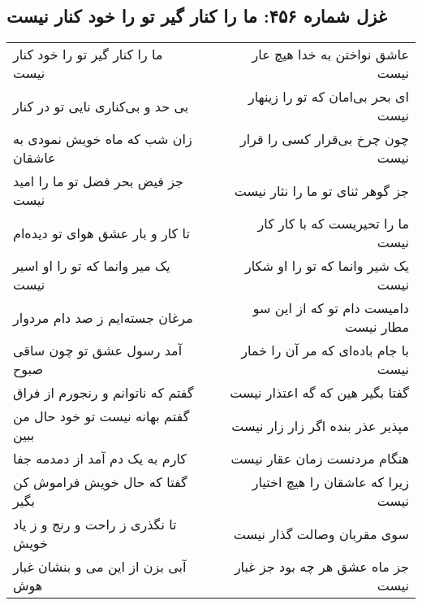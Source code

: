 \begin{center}
\section*{غزل شماره ۴۵۶: ما را کنار گیر تو را خود کنار نیست}
\label{sec:0456}
\begin{longtable}{l p{0.5cm} r}
ما را کنار گیر تو را خود کنار نیست
&&
عاشق نواختن به خدا هیچ عار نیست
\\
بی حد و بی‌کناری نایی تو در کنار
&&
ای بحر بی‌امان که تو را زینهار نیست
\\
زان شب که ماه خویش نمودی به عاشقان
&&
چون چرخ بی‌قرار کسی را قرار نیست
\\
جز فیض بحر فضل تو ما را امید نیست
&&
جز گوهر ثنای تو ما را نثار نیست
\\
تا کار و بار عشق هوای تو دیده‌ام
&&
ما را تحیریست که با کار کار نیست
\\
یک میر وانما که تو را او اسیر نیست
&&
یک شیر وانما که تو را او شکار نیست
\\
مرغان جسته‌ایم ز صد دام مردوار
&&
دامیست دام تو که از این سو مطار نیست
\\
آمد رسول عشق تو چون ساقی صبوح
&&
با جام باده‌ای که مر آن را خمار نیست
\\
گفتم که ناتوانم و رنجورم از فراق
&&
گفتا بگیر هین که گه اعتذار نیست
\\
گفتم بهانه نیست تو خود حال من ببین
&&
مپذیر عذر بنده اگر زار زار نیست
\\
کارم به یک دم آمد از دمدمه جفا
&&
هنگام مردنست زمان عقار نیست
\\
گفتا که حال خویش فراموش کن بگیر
&&
زیرا که عاشقان را هیچ اختیار نیست
\\
تا نگذری ز راحت و رنج و ز یاد خویش
&&
سوی مقربان وصالت گذار نیست
\\
آبی بزن از این می و بنشان غبار هوش
&&
جز ماه عشق هر چه بود جز غبار نیست
\\
\end{longtable}
\end{center}
